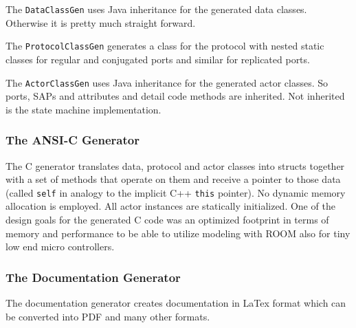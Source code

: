 The \texttt{DataClassGen} uses Java inheritance for the generated data classes. Otherwise it is pretty 
much straight forward.

The \texttt{ProtocolClassGen} generates a class for the protocol with nested static classes for regular 
and conjugated ports and similar for replicated ports.

The \texttt{ActorClassGen} uses Java inheritance for the generated actor classes. So ports, SAPs and 
attributes and detail code methods are inherited. Not inherited is the state machine implementation.

\subsubsection{The ANSI-C Generator}

The C generator translates data, protocol and actor classes into structs together with a set of methods 
that operate on them and receive a pointer to those data (called \texttt{self} in analogy to the implicit 
C++ \texttt{this} pointer).
No dynamic memory allocation is employed. All actor instances are statically initialized.
One of the design goals for the generated C code was an optimized footprint in terms of memory and 
performance to be able to utilize modeling with ROOM also for tiny low end micro controllers.

\subsubsection{The Documentation Generator}

The documentation generator creates documentation in LaTex format which can be converted into PDF and many 
other formats.
